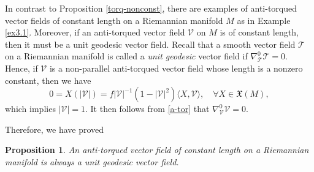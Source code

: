 \documentclass[12pt]{amsart}
\newtheorem{proposition}[theorem]{Proposition}
\theoremstyle{definition}
\begin{document}
In contrast to Proposition \ref{torq-nonconst}, there are examples of anti-torqued vector fields of constant length on a Riemannian manifold $M$ as in Example \ref{ex3.1}. Moreover, if an anti-torqued vector field $\mathcal{V}$ on $M$ is of constant length, then it must be a unit geodesic vector field. Recall that a smooth vector field $\mathcal{T}$ on a Riemannian manifold is called a {\it unit geodesic} vector field if $\nabla^0_{\mathcal{T}}\mathcal{T}=0$. Hence, if $\mathcal{V}$ is a non-parallel anti-torqued vector field  whose length is a nonzero constant, then we have 
\begin{equation*}
0=X(|\mathcal{V}|)=f|\mathcal{V}|^{-1}(1-|\mathcal{V}|^2)\langle X,\mathcal{V} \rangle , \quad \forall X \in \mathfrak{X}(M),   
\end{equation*}
which implies $|\mathcal{V}|=1$. It then follows from \eqref{a-tor} that $\nabla^0_{\mathcal{V}}\mathcal{V}=0$.

Therefore, we have proved
\begin{proposition}  \label{anti-unit}
An anti-torqued vector field of constant length on a Riemannian manifold is always a unit geodesic vector field. 
\end{proposition}

\end{document}
